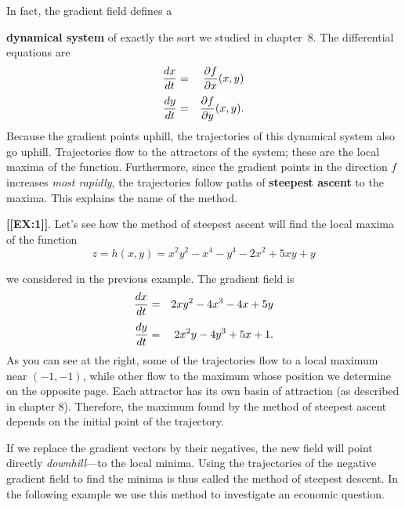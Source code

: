 {{{{        In fact, the gradient field defines a 

{\bf dynamical system} of exactly the sort we studied in chapter~8.  The differential equations are
        \begin{eqnarray*}
        {dx \over dt} &=& {\partial f \over \partial x}(x, y) \\[3pt]
        {dy \over dt} &=& {\partial f \over \partial y}(x, y).
        \end{eqnarray*}
Because the gradient points uphill, 
the trajectories of this dynamical system also go uphill.  Trajectories flow to the attractors of the system; these are the local maxima of the function.  Furthermore, since the gradient points in the direction $f$ increases {\em most rapidly}, the trajectories follow paths of {\bf steepest ascent} to the maxima.  This explains the name of the method.   
\medskip


{\bf [[EX:1]]}.  Let's see how the method of steepest ascent will find the local maxima of the function 
        \[
z = h(x, y) = x^2 y^2 - x^4 - y^4 - 2x^2 + 5 xy + y
\]

\noindent
we considered in the previous example.  The gradient field is
        \begin{eqnarray*}
        {dx \over dt} &=& 2 x y^2 - 4 x^3 - 4 x + 5 y \\[3pt]
        {dy \over dt} &=& 2 x^2 y - 4 y^3 + 5 x + 1.
        \end{eqnarray*}
As you can see at the right, some of the trajectories flow to a local maximum near $(-1, -1)$, while other flow to the maximum whose position we determine on the opposite page.  Each attractor has its own basin of attraction (as described in chapter 8).  Therefore, the maximum found by the method of steepest ascent depends on the initial point of the trajectory.

        If we replace the gradient vectors by their negatives, 
the new field will point directly {\em downhill\/}---to the local minima.  Using the trajectories of the negative gradient field to find the minima is thus called the method of steepest descent.  In the following example we use this method to investigate an economic question.
\medskip

}}}}
